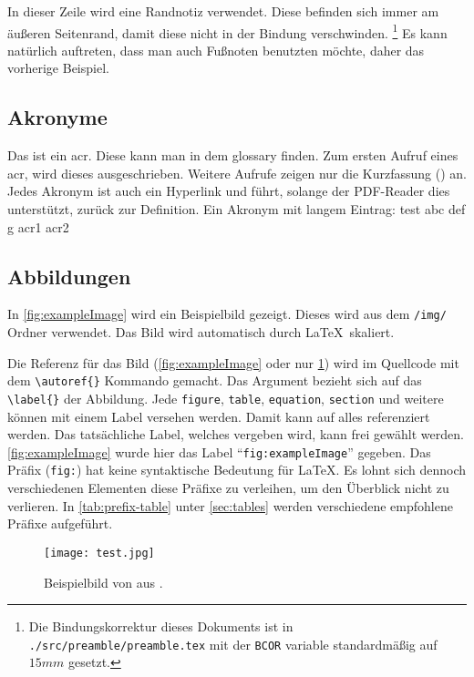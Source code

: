In dieser Zeile wird eine Randnotiz verwendet.
Diese befinden sich immer am äußeren Seitenrand, damit diese nicht in der Bindung verschwinden.
\footnote{Die Bindungskorrektur dieses Dokuments ist in \texttt{./src/preamble/preamble.tex} mit der \texttt{BCOR} variable standardmäßig auf $15\si{mm}$ gesetzt.}
Es kann natürlich auftreten, dass man auch Fußnoten benutzten möchte, daher das vorherige Beispiel.

\subsection{Akronyme}

Das ist ein \gls{acr}.
Diese kann man in dem \gls{glossary} finden.
Zum ersten Aufruf eines \gls{acr}, wird dieses ausgeschrieben.
Weitere Aufrufe zeigen nur die Kurzfassung () an.
Jedes Akronym ist auch ein Hyperlink und führt, solange der PDF-Reader dies unterstützt, zurück zur Definition.
Ein Akronym mit langem Eintrag: \gls{test} \gls{abc} \gls{def} \gls{g} \gls{acr1} \gls{acr2}

\subsection{Abbildungen}

In \autoref{fig:exampleImage} wird ein Beispielbild gezeigt.
Dieses wird aus dem \texttt{/img/} Ordner verwendet.
Das Bild wird automatisch durch \LaTeX\ skaliert.

Die Referenz für das Bild (\autoref{fig:exampleImage} oder nur \ref{fig:exampleImage}) wird im Quellcode mit dem \texttt{\textbackslash autoref\{\}} Kommando gemacht.
Das Argument bezieht sich auf das \texttt{\textbackslash label\{\}} der Abbildung.
Jede \texttt{figure}, \texttt{table}, \texttt{equation}, \texttt{section} und weitere können mit einem Label versehen werden.
Damit kann auf alles referenziert werden.
Das tatsächliche Label, welches vergeben wird, kann frei gewählt werden.
\autoref{fig:exampleImage} wurde hier das Label \enquote{\texttt{fig:exampleImage}} gegeben.
Das Präfix (\texttt{fig:}) hat keine syntaktische Bedeutung für \LaTeX.
Es lohnt sich dennoch verschiedenen Elementen diese Präfixe zu verleihen, um den Überblick nicht zu verlieren.
In \autoref{tab:prefix-table} unter \autoref{sec:tables} werden verschiedene empfohlene Präfixe aufgeführt.

\begin{figure}[ht]
    \centering
    \texttt{[image: test.jpg]}
    \caption[Beispielbild]{Beispielbild von \citeauthor{exampleImage} aus \autocite{exampleImage}.}
    \label{fig:exampleImage}
\end{figure}

